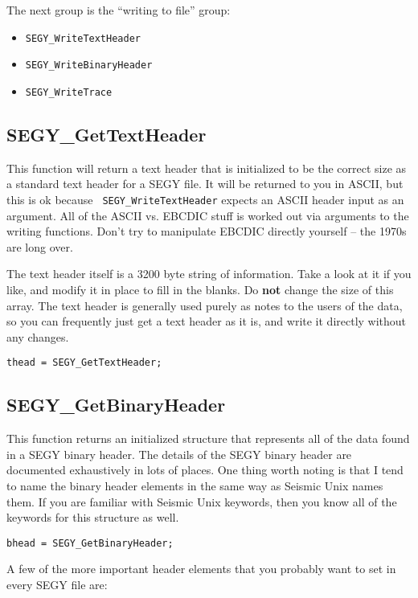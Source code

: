 \documentclass[10pt]{article}
\newcommand{\segy}{{\scriptsize SEGY}\xspace}
\newcommand{\ascii}{{\scriptsize ASCII}\xspace}
\newcommand{\ebcdic}{{\scriptsize EBCDIC}\xspace}
\begin{document}
The next group is the ``writing to file'' group:
\begin{itemize}
\item {\tt SEGY\_WriteTextHeader}
\item {\tt SEGY\_WriteBinaryHeader}
\item {\tt SEGY\_WriteTrace}
\end{itemize}

\subsection{SEGY\_GetTextHeader}
This function will return a text header that is initialized to be the
correct size as a standard text header for a \segy file. It will be
returned to you in \ascii, but this is ok because {\tt
  SEGY\_WriteTextHeader} expects an \ascii header input as an
argument. All of the \ascii vs. \ebcdic stuff is worked out via
arguments to the writing functions. Don't try to manipulate \ebcdic
directly yourself -- the 1970s are long over.

The text header itself is a 3200 byte string of information. Take a
look at it if you like, and modify it in place to fill in the blanks.
Do {\bf not} change the size of this array. The text header is
generally used purely as notes to the users of the data, so you can
frequently just get a text header as it is, and write it directly
without any changes.
\begin{verbatim}
thead = SEGY_GetTextHeader;
\end{verbatim}

\subsection{SEGY\_GetBinaryHeader}
This function returns an initialized structure that represents all of
the data found in a \segy binary header. The details of the \segy
binary header are documented exhaustively in lots of places. One thing
worth noting is that I tend to name the binary header elements in the
same way as Seismic Unix names them. If you are familiar with Seismic
Unix keywords, then you know all of the keywords for this structure as
well. 

\begin{verbatim}
bhead = SEGY_GetBinaryHeader;
\end{verbatim}

A few of the more important header elements that you probably want to
set in every \segy file are:
\end{document}
